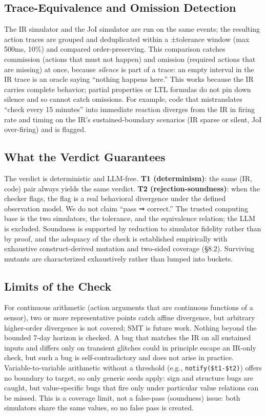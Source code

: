 \documentclass[sigconf,nonacm,anonymous,review]{acmart}
\begin{document}
\subsection{Trace-Equivalence and Omission Detection}

The IR simulator and the JoI simulator are run on the same events; the resulting action traces are grouped and deduplicated within a ±tolerance window (max 500ms, 10\%) and compared order-preserving. This comparison catches commission (actions that must not happen) and omission (required actions that are missing) at once, because \emph{silence} is part of a trace: an empty interval in the IR trace is an oracle saying ``nothing happens here.'' This works because the IR carries complete behavior; partial properties or LTL formulas do not pin down silence and so cannot catch omissions. For example, code that mistranslates ``check every 15 minutes'' into immediate reaction diverges from the IR in firing rate and timing on the IR's sustained-boundary scenarios (IR sparse or silent, JoI over-firing) and is flagged.

\subsection{What the Verdict Guarantees}

The verdict is deterministic and LLM-free. \textbf{T1 (determinism)}: the same (IR, code) pair always yields the same verdict. \textbf{T2 (rejection-soundness)}: when the checker flags, the flag is a real behavioral divergence under the defined observation model. We do not claim ``pass ⇒ correct.'' The trusted computing base is the two simulators, the tolerance, and the equivalence relation; the LLM is excluded. Soundness is supported by reduction to simulator fidelity rather than by proof, and the adequacy of the check is established empirically with exhaustive construct-derived mutation and two-sided coverage (\S8.2). Surviving mutants are characterized exhaustively rather than lumped into buckets.

\subsection{Limits of the Check}

For continuous arithmetic (action arguments that are continuous functions of a sensor), two or more representative points catch affine divergence, but arbitrary higher-order divergence is not covered; SMT is future work. Nothing beyond the bounded 7-day horizon is checked. A bug that matches the IR on all sustained inputs and differs only on transient glitches could in principle escape an IR-only check, but such a bug is self-contradictory and does not arise in practice. Variable-to-variable arithmetic without a threshold (e.g., \texttt{notify(\$t1-\$t2)}) offers no boundary to target, so only generic seeds apply: sign and structure bugs are caught, but value-specific bugs that fire only under particular value relations can be missed. This is a coverage limit, not a false-pass (soundness) issue: both simulators share the same values, so no false pass is created.
\end{document}
